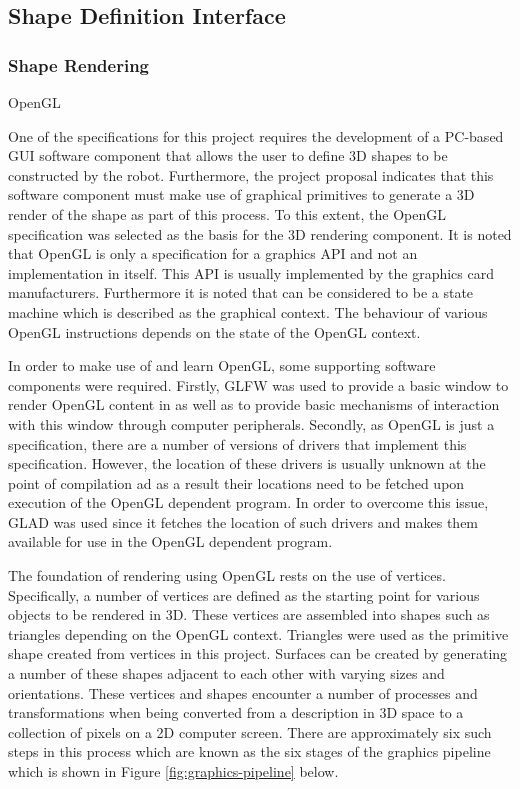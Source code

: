 \subsection{Shape Definition Interface}

\subsubsection{Shape Rendering}

OpenGL

One of the specifications for this project requires the development of a PC-based GUI software component that allows the user to define 3D shapes to be constructed by the robot. Furthermore, the project proposal indicates that this software component must make use of graphical primitives to generate a 3D render of the shape as part of this process. To this extent, the OpenGL specification was selected as the basis for the 3D rendering component. It is noted that OpenGL is only a specification for a graphics API and not an implementation in itself. This API is usually implemented by the graphics card manufacturers. Furthermore it is noted that can be considered to be a state machine which is described as the graphical context. The behaviour of various OpenGL instructions depends on the state of the OpenGL context.

In order to make use of and learn OpenGL, some supporting software components were required. Firstly, GLFW was used to provide a basic window to render OpenGL content in as well as to provide basic mechanisms of interaction with this window through computer peripherals. Secondly, as OpenGL is just a specification, there are a number of versions of drivers that implement this specification. However, the location of these drivers is usually unknown at the point of compilation ad as a result their locations need to be fetched upon execution of the OpenGL dependent program. In order to overcome this issue, GLAD was used since it fetches the location of such drivers and makes them available for use in the OpenGL dependent program.

The foundation of rendering using OpenGL rests on the use of vertices. Specifically, a number of vertices are defined as the starting point for various objects to be rendered in 3D. These vertices are assembled into shapes such as triangles depending on the OpenGL context. Triangles were used as the primitive shape created from vertices in this project. Surfaces can be created by generating a number of these shapes adjacent to each other with varying sizes and orientations. These vertices and shapes encounter a number of processes and transformations when being converted from a description in 3D space to a collection of pixels on a 2D computer screen. There are approximately six such steps in this process which are known as the six stages of the graphics pipeline which is shown in Figure \ref{fig:graphics-pipeline} below.

